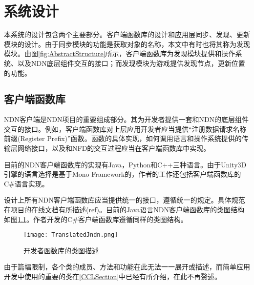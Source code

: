 % 
%
%
% 
%

\chapter{系统设计}
\label{DesignChapter}
本系统的设计包含两个主要部分。客户端函数库的设计和应用层同步、发现、更新模块的设计。由于同步模块的功能是获取对象的名称，本文中有时也将其称为发现模块。由图\ref{fig:AbstractStructure}所示，客户端函数库为发现模块提供和操作系统、以及NDN底层组件交互的接口；而发现模块为游戏提供发现节点，更新位置的功能。

\section{客户端函数库}
\par
NDN客户端是NDN项目的重要组成部分。其为开发者提供一套和NDN的底层组件交互的接口。例如，客户端函数库对上层应用开发者应当提供“注册数据请求名称前缀(Register Prefix)”函数。函数的具体实现，如何调用语言和操作系统提供的传输层网络接口，以及和NFD的交互过程应当在客户端函数库中实现。
\par
目前的NDN客户端函数库的实现有Java，Python和C++三种语言。由于Unity3D引擎的语言选择是基于Mono Framework的，作者的工作还包括客户端函数库的C\#语言实现。
\par
设计上所有NDN客户端函数库应当提供统一的接口，遵循统一的规定。具体规范在项目的在线文档有所描述(ref)。目前的Java语言NDN客户端函数库的类图结构如图\ref{fig:CCLClassDiagram}。作者开发的C\#客户端函数库遵循同样的类图结构。
\begin{figure}[h!]
	\centering
	\texttt{[image: TranslatedJndn.png]}
	\caption{开发者函数库的类图描述}
	\label{fig:CCLClassDiagram}
\end{figure}
\par
由于篇幅限制，各个类的成员、方法和功能在此无法一一展开或描述，而简单应用开发中使用的重要的类在\ref{CCLSection}中已经有所介绍，在此不再赘述。

